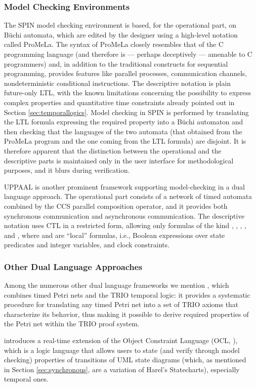 \subsubsection*{Model Checking Environments}
The SPIN model checking environment \cite{Hol03} is based, for the 
operational part, on B\"uchi automata, which are edited by the 
designer using a high-level notation called ProMeLa. The syntax 
of ProMeLa closely resembles that of the C programming language 
(and therefore is --- perhaps deceptively --- amenable to C programmers) 
and, in addition to the traditional constructs for sequential 
programming, provides features like parallel processes, communication 
channels, nondeterministic conditional instructions. The descriptive 
notation is plain future-only LTL, with the known limitations 
concerning the possibility to express complex properties and 
quantitative time constraints already pointed out in Section \ref{sec:temporallogics}. 
Model checking in SPIN is performed by translating the LTL formula 
expressing the required property into a B\"uchi automaton and 
then checking that the languages of the two automata (that obtained 
from the ProMeLa program and the one coming from the LTL formula) 
are disjoint. It is therefore apparent that the distinction between 
the operational and the descriptive parts is maintained only 
in the user interface for methodological purposes, and it blurs 
during verification.

UPPAAL \cite{LPY97} is another prominent framework supporting model-checking 
in a dual language approach. The operational part consists of 
a network of timed automata combined by the CCS parallel composition 
operator, and it provides both synchronous communication and 
asynchronous communication. The descriptive notation uses CTL 
in a restricted form, allowing only formulas of the kind ,
, , , and ,
where  and  are ``local'' formulas, i.e., Boolean expressions 
over state predicates and integer variables, and clock constraints.


\subsubsection*{Other Dual Language Approaches}
Among the numerous other dual language frameworks \cite{JM94} we mention \linebreak \cite{FMM94},
which combines timed Petri nets and the TRIO temporal logic: it provides a systematic
procedure for translating any timed Petri net into a set of TRIO axioms that characterize its 
behavior, thus making it possible to derive required properties 
of the Petri net within the TRIO proof system.

\cite{FM02} introduces a real-time extension of the Object Constraint 
Language (OCL, \cite{WK99}), which is a logic language that allows 
users to state (and verify through model checking) properties of transitions 
of UML state diagrams (which, as mentioned in Section \ref{sec:synchronous}, 
are a variation of Harel's Statecharts), especially temporal ones.

